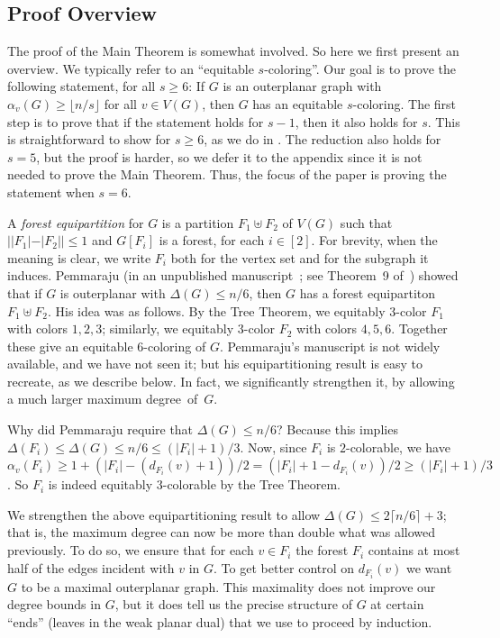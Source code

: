 \documentclass[11pt]{article}
\theoremstyle{definition}
\newcommand\floor[1]{\lfloor#1\rfloor}
\newcommand\ceil[1]{\lceil#1\rceil}
\renewcommand\ge\geqslant
\renewcommand\le\leqslant
\begin{document}
\subsection{Proof Overview}
\label{proof-overview-sec}
The proof of the Main Theorem is somewhat involved.  So here we first present an overview.
We typically refer to an ``equitable $s$-coloring''.  Our goal is to prove the following statement, for all $s\ge 6$: If $G$ is an outerplanar graph 
with $\alpha_v(G)\ge \floor{n/s}$ for all $v\in V(G)$, then $G$ has an equitable $s$-coloring.  The first step is to prove that if the statement holds for 
$s-1$, then it also holds for $s$.  This is straightforward to show for $s\ge 6$, as we do in .  The reduction also holds for 
$s=5$, but the proof is harder, so we defer it to the appendix since it is not needed to prove the Main Theorem.  
Thus, the focus of the paper is proving the statement when $s=6$.

A \emph{forest equipartition} for $G$ is a partition $F_1\uplus F_2$ of $V(G)$ such that $||F_1|-|F_2||\le 1$ and $G[F_i]$ is a forest, for each 
$i\in[2]$.  For brevity, when the meaning is clear, we write $F_i$ both for the vertex set and for the subgraph it induces.
Pemmaraju (in an unpublished manuscript~\cite{pemmaraju-manuscript}; see Theorem~9 of~\cite{pemmaraju-extends}) showed that if $G$ is outerplanar 
with $\Delta(G)\le n/6$, then $G$ has a forest equipartiton $F_1\uplus F_2$.  His idea was as follows.  
By the Tree Theorem, we 
equitably $3$-color $F_1$ with colors $1,2,3$; similarly, we equitably $3$-color $F_2$ with colors $4,5,6$.  Together these give an equitable
$6$-coloring of $G$.  Pemmaraju's manuscript is not widely available, and we have not seen it; but his equipartitioning result is easy to recreate, as
we describe below.  In fact, we significantly strengthen it, by allowing a much larger maximum degree~of~$G$.

Why did Pemmaraju require that $\Delta(G)\le n/6$? Because this implies $\Delta(F_i)\le \Delta(G)\le n/6\le (|F_i|+1)/3$.
Now, since $F_i$ is $2$-colorable, we have $\alpha_v(F_i)\ge 1+(|F_i|-(d_{F_i}(v)+1))/2 = (|F_i|+1-d_{F_i}(v))/2 \ge (|F_i|+1)/3$.
So $F_i$ is indeed equitably $3$-colorable by the Tree Theorem.  

We strengthen the above equipartitioning result to allow $\Delta(G)\le 2\ceil{n/6}+3$;
that is, the maximum degree can now be more than double what was allowed previously.  To do so, we ensure that for each $v\in F_i$ the forest $F_i$
contains at most half of the edges incident with $v$ in $G$.  To get better control on $d_{F_i}(v)$ we want $G$ to be a maximal outerplanar graph.
This maximality does not improve our degree bounds in $G$, but it does tell us the precise structure of $G$ at certain ``ends'' (leaves in the weak 
planar dual) that we use to proceed by induction.  
\end{document}
